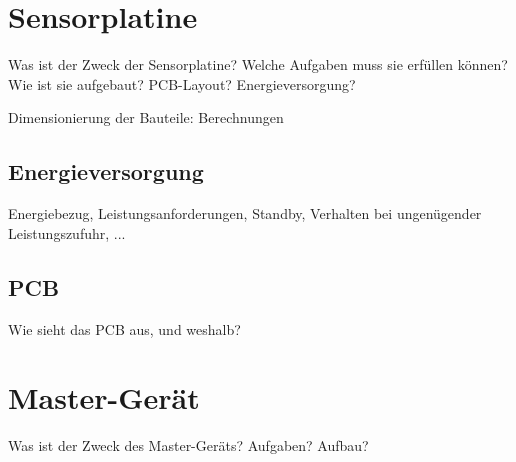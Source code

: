 
\clearpage
\section{Sensorplatine}
\label{sec:hw:sensorplatine}

Was  ist der  Zweck  der Sensorplatine? Welche  Aufgaben  muss sie  erf\"ullen
k\"onnen? Wie ist sie aufgebaut? PCB-Layout? Energieversorgung?

\anweisung Dimensionierung der Bauteile: Berechnungen

\subsection{Energieversorgung}
\label{subsec:sensor:pcb}

Energiebezug,  Leistungsanforderungen, Standby,  Verhalten bei  ungen\"ugender
Leistungszufuhr, ...


\subsection{PCB}
\label{subsec:sensor:pcb}

Wie sieht das PCB aus, und weshalb?

\section{Master-Ger\"at}
\label{sec:hw:mastergerat}

Was ist der Zweck des Master-Ger\"ats? Aufgaben? Aufbau?

